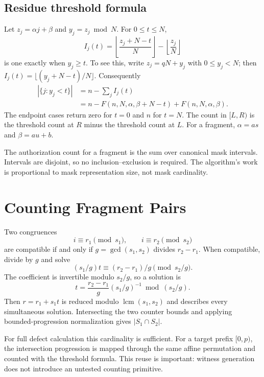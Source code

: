 \documentclass[11pt,onecolumn]{IEEEtran}
\begin{document}
\subsection{Residue threshold formula}
Let $z_j=\alpha j+\beta$ and $y_j=z_j\bmod N$.  For $0\leq t\leq N$,
\begin{equation}
 I_j(t)=\left\lfloor\frac{z_j+N-t}{N}\right\rfloor-
        \left\lfloor\frac{z_j}{N}\right\rfloor
\end{equation}
is one exactly when $y_j\geq t$.  To see this, write $z_j=qN+y_j$ with $0\leq y_j<N$; then $I_j(t)=\lfloor(y_j+N-t)/N\rfloor$.  Consequently
\begin{align}
 |\{j:y_j<t\}|
 &=n-\sum_jI_j(t)\\
 &=n-F(n,N,\alpha,\beta+N-t)+F(n,N,\alpha,\beta).
\end{align}
The endpoint cases return zero for $t=0$ and $n$ for $t=N$.  The count in $[L,R)$ is the threshold count at $R$ minus the threshold count at $L$.  For a fragment, $\alpha=as$ and $\beta=au+b$.

The authorization count for a fragment is the sum over canonical mask intervals.  Intervals are disjoint, so no inclusion--exclusion is required.  The algorithm's work is proportional to mask representation size, not mask cardinality.

\section{Counting Fragment Pairs}
Two congruences
\begin{equation}
 i\equiv r_1\pmod{s_1},\qquad i\equiv r_2\pmod{s_2}
\end{equation}
are compatible if and only if $g=\gcd(s_1,s_2)$ divides $r_2-r_1$.  When compatible, divide by $g$ and solve
\begin{equation}
 (s_1/g)t\equiv(r_2-r_1)/g\pmod{s_2/g}.
\end{equation}
The coefficient is invertible modulo $s_2/g$, so a solution is
\begin{equation}
 t=\frac{r_2-r_1}{g}(s_1/g)^{-1}\bmod(s_2/g).
\end{equation}
Then $r=r_1+s_1t$ is reduced modulo $\operatorname{lcm}(s_1,s_2)$ and describes every simultaneous solution.  Intersecting the two counter bounds and applying bounded-progression normalization gives $|S_1\cap S_2|$.

For full defect calculation this cardinality is sufficient.  For a target prefix $[0,p)$, the intersection progression is mapped through the same affine permutation and counted with the threshold formula.  This reuse is important: witness generation does not introduce an untested counting primitive.
\end{document}

